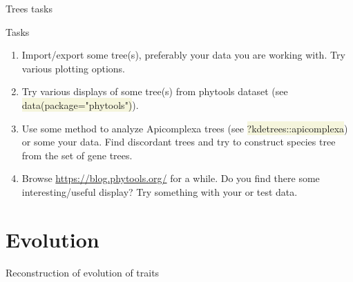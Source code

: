 \documentclass[compress, xelatex, 11pt, xcolor=svgnames, aspectratio=169, url={hyphens, lowtilde}]{beamer}
\renewcommand{\texttt}[1]{\colorbox{Beige}{{\ttfamily #1}}}
\begin{document}
\begin{frame}{Trees tasks}
	\begin{exampleblock}{Tasks}
		\begin{enumerate}
			\item Import/export some tree(s), preferably your data you are working with. Try various plotting options.
			\item Try various displays of some tree(s) from phytools dataset (see \texttt{data(package="phytools")}).
			\item Use some method to analyze Apicomplexa trees (see \texttt{?kdetrees::apicomplexa}) or some your data. Find discordant trees and try to construct species tree from the set of gene trees.
			\item Browse \url{https://blog.phytools.org/} for a while. Do you find there some interesting/useful display? Try something with your or test data.
		\end{enumerate}
	\end{exampleblock}
\end{frame}

\section{Evolution}

\begin{frame}{Reconstruction of evolution of traits}
	\tableofcontents[currentsection, sectionstyle=show/hide, hideothersubsections]
\end{frame}
\end{document}
